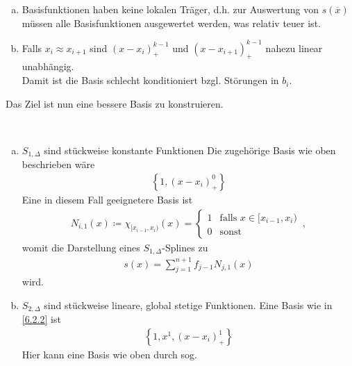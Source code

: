 

\begin{enumerate}[a)]
\item Basisfunktionen haben keine lokalen Träger,
  d.h. zur Auswertung von $s(\overline{x})$ müssen
  alle Basisfunktionen ausgewertet werden, was relativ teuer ist.
\item Falls $x_i\approx x_{i+1}$ sind 
  $(x-x_i)_+^{k-1}$ und $(x-x_{i+1})_+^{k-1}$
  nahezu linear unabhängig.\\
  Damit ist die Basis schlecht konditioniert bzgl. Störungen in $b_i$.
\end{enumerate}

Das Ziel ist nun eine bessere Basis zu konstruieren.

\begin{Bspe}~
  \begin{enumerate}[a)]
  \item {}
    $S_{1,\Delta}$ sind stückweise konstante Funktionen
    \label{im6.2.4(1)}
    Die zugehörige Basis wie oben beschrieben wäre
\begin{gather*}
  \left\{ 1,(x-x_i)_+^0\right\}
\end{gather*}
    Eine in diesem Fall geeignetere Basis ist
\begin{gather*}
  N_{i,1} (x)\coloneqq \chi_{[x_{i-1},x_i)}(x)
             = \begin{cases}
               1 & \text{falls } x\in[x_{i-1},x_i)\\
               0 & \text{sonst}
             \end{cases}\, ,
\end{gather*}
womit die Darstellung eines $S_{1,\Delta}$-Splines zu 
\begin{gather*}
  s(x) = \sum_{j=1}^{n+1} f_{j-1} N_{j,1}(x)
\end{gather*}
wird.
\item {} $S_{2,\Delta}$ sind stückweise lineare, global stetige
  Funktionen. Eine Basis wie in \ref{6.2.2} ist
\begin{gather*}
  \left\{1,x^1, (x-x_i)_+^1\right\}
\end{gather*}
  \label{im6.2.4(2)}
  Hier kann eine Basis wie oben durch sog. 

\end{enumerate}
\end{Bspe}
